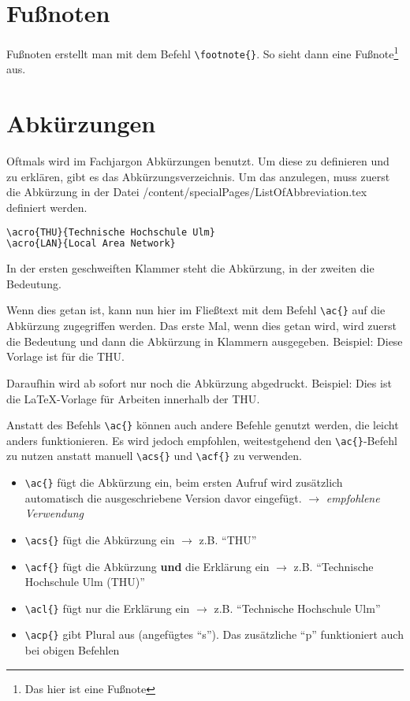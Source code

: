 \section{Fußnoten}
Fußnoten erstellt man mit dem Befehl \texttt{\textbackslash{}footnote\{\}}. So sieht dann eine Fußnote\footnote{Das hier ist eine Fußnote} aus.

\section{Abkürzungen}
Oftmals wird im Fachjargon Abkürzungen benutzt. Um diese zu definieren und zu erklären, gibt es das Abkürzungsverzeichnis. Um das anzulegen, muss zuerst die Abkürzung in der Datei /content/specialPages/ListOfAbbreviation.tex definiert werden.

\begin{lstlisting}[caption=Beispiel einer Akromym-Definition, label=lst:acronym_def, language=bash]
\acro{THU}{Technische Hochschule Ulm}
\acro{LAN}{Local Area Network}
\end{lstlisting}

In der ersten geschweiften Klammer steht die Abkürzung, in der zweiten die Bedeutung.

Wenn dies getan ist, kann nun hier im Fließtext mit dem Befehl \texttt{\textbackslash{}ac\{\}} auf die Abkürzung zugegriffen werden. Das erste Mal, wenn dies getan wird, wird zuerst die Bedeutung und dann die Abkürzung in Klammern ausgegeben. Beispiel: Diese Vorlage ist für die \ac{THU}.

Daraufhin wird ab sofort nur noch die Abkürzung abgedruckt. Beispiel: Dies ist die LaTeX-Vorlage für Arbeiten innerhalb der \ac{THU}.

Anstatt des Befehls \texttt{\textbackslash{}ac\{\}} können auch andere Befehle genutzt werden, die leicht anders funktionieren. Es wird jedoch empfohlen, weitestgehend den \texttt{\textbackslash{}ac\{\}}-Befehl zu nutzen anstatt manuell \texttt{\textbackslash{}acs\{\}} und \texttt{\textbackslash{}acf\{\}} zu verwenden.

\begin{itemize}
    \item \texttt{\textbackslash{}ac\{\}} fügt die Abkürzung ein, beim ersten Aufruf wird zusätzlich automatisch die ausgeschriebene Version davor eingefügt. $\rightarrow$ \textit{empfohlene Verwendung}
    \item \texttt{\textbackslash{}acs\{\}} fügt die Abkürzung ein $\rightarrow$ z.B. \enquote{THU}
    \item \texttt{\textbackslash{}acf\{\}} fügt die Abkürzung \textbf{und} die Erklärung ein $\rightarrow$ z.B. \enquote{Technische Hochschule Ulm (THU)}
    \item \texttt{\textbackslash{}acl\{\}} fügt nur die Erklärung ein $\rightarrow$ z.B. \enquote{Technische Hochschule Ulm}
    \item \texttt{\textbackslash{}acp\{\}} gibt Plural aus (angefügtes \enquote{s}). Das zusätzliche \enquote{p} funktioniert auch bei obigen Befehlen
\end{itemize}



